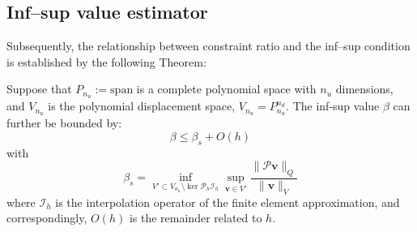 \subsection{Inf--sup value estimator}
Subsequently, the relationship between constraint ratio and the inf--sup condition is established by the following Theorem:
\begin{thm}
Suppose that $P_{n_u}:=\mathrm{span}$ is a complete polynomial space with $n_u$ dimensions, and $V_{n_u}$ is the polynomial displacement space, $V_{n_u} = P_{n_u}^{n_d}$. The inf-sup value $\beta$ can further be bounded by:
\begin{equation}\label{estimator}
\beta \le \beta_s + O(h)
\end{equation}
with
\begin{equation}\label{beta_s}
\beta_s = \inf_{V' \subset V_{n_u} \setminus \ker \mathcal{P}_h \mathcal{I}_h} \sup_{\boldsymbol{v} \in V'} \frac{\|\mathcal{P} \boldsymbol{v}\|_Q}{\|\boldsymbol{v}\|_V}
\end{equation}
where $\mathcal{I}_h$ is the interpolation operator of the finite element approximation, and correspondingly, $O(h)$ is the remainder related to $h$.
\end{thm}

